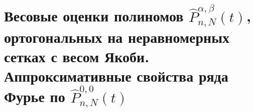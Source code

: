 \section{Весовые оценки полиномов $\hat{P}_{n,N}^{\alpha,\beta}(t)$, ортогональных на неравномерных сетках с весом Якоби. Аппроксимативные свойства ряда Фурье по $\hat{P}_{n,N}^{0,0}(t)$}





